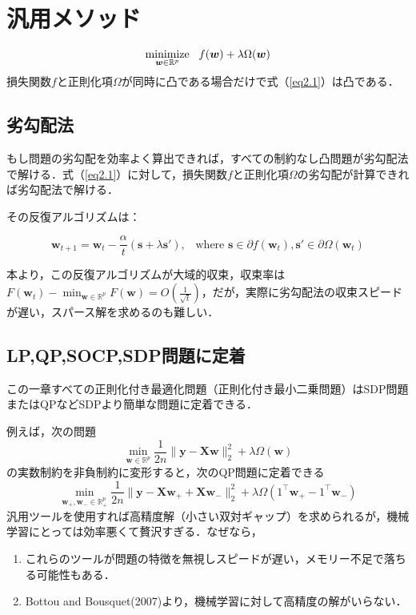 \documentclass[a4paper,11pt]{jsarticle}
\numberwithin{theorem}{section}  %
\numberwithin{equation}{section} %
\newcommand{\minimize}{\mathop{\mathrm{\rm minimize}}\limits}
\begin{document}
\section{汎用メソッド}

\begin{equation}
\minimize_{\bm{w} \in \mathbb{R}^p}\,\,\,\, f(\bm{w}) + \lambda \Omega(\bm{w})
\label{eq2.1}
\end{equation}
損失関数$f$と正則化項$\Omega$が同時に凸である場合だけで式（\ref{eq2.1}）は凸である．

\subsection{劣勾配法}
もし問題の劣勾配を効率よく算出できれば，すべての制約なし凸問題が劣勾配法で解ける．式（\ref{eq2.1}）に対して，損失関数$f$と正則化項$\Omega$の劣勾配が計算できれば劣勾配法で解ける．

その反復アルゴリズムは：

\begin{equation}
\bm{w}_{t+1} = \bm{w}_t - \frac{\alpha}{t}(\bm{s} + \lambda\bm{s}'), \,\,\, \text{ where } \bm{s} \in \partial f(\bm{w}_t), \bm{s}' \in \partial \Omega (\bm{w}_t) 
\end{equation}

本\cite{iloco}より，この反復アルゴリズムが大域的収束，収束率は$F(\bm{w}_t) - \min_{\bm{w}\in \mathbb{R}^p} F(\bm{w}) = O(\frac{1}{\sqrt{t}})$，だが，実際に劣勾配法の収束スピードが遅い，スパース解を求めるのも難しい．

\subsection{LP,QP,SOCP,SDP問題に定着}
この一章すべての正則化付き最適化問題（正則化付き最小二乗問題）はSDP問題またはQPなどSDPより簡単な問題に定着できる．

例えば，次の問題
\begin{equation}
\min_{\bm{w} \in \mathbb{R}^p} \frac{1}{2n}\| \bm{y} - \bm{X}\bm{w} \|_2^2 + \lambda \Omega(\bm{w})
\end{equation}
の実数制約を非負制約に変形すると，次のQP問題に定着できる
\begin{equation}
\min_{\bm{w}_+,\bm{w}_- \in \mathbb{R}^p_+} \frac{1}{2n}\| \bm{y} - \bm{X}\bm{w}_+ + \bm{X}\bm{w}_-  \|_2^2 + \lambda \Omega(1^\intercal \bm{w}_+ - 1^\intercal \bm{w}_-)
\end{equation}
汎用ツールを使用すれば高精度解（小さい双対ギャップ）を求められるが，機械学習にとっては効率悪くて贅沢すぎる．なぜなら，
\begin{enumerate}
\item これらのツールが問題の特徴を無視しスピードが遅い，メモリー不足で落ちる可能性もある．
\item Bottou and Bousquet(2007)より，機械学習に対して高精度の解がいらない． 
\end{enumerate}
\end{document}
